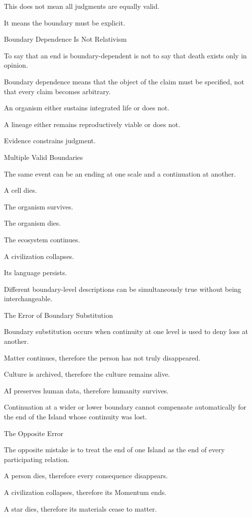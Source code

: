 This does not mean all judgments are equally valid.

It means the boundary must be explicit.

Boundary Dependence Is Not Relativism

To say that an end is boundary-dependent is not to say that death exists only in opinion.

Boundary dependence means that the object of the claim must be specified, not that every claim becomes arbitrary.

An organism either sustains integrated life or does not.

A lineage either remains reproductively viable or does not.

Evidence constrains judgment.

Multiple Valid Boundaries

The same event can be an ending at one scale and a continuation at another.

A cell dies.

The organism survives.

The organism dies.

The ecosystem continues.

A civilization collapses.

Its language persists.

Different boundary-level descriptions can be simultaneously true without being interchangeable.

The Error of Boundary Substitution

Boundary substitution occurs when continuity at one level is used to deny loss at another.

Matter continues, therefore the person has not truly disappeared.

Culture is archived, therefore the culture remains alive.

AI preserves human data, therefore humanity survives.

Continuation at a wider or lower boundary cannot compensate automatically for the end of the Island whose continuity was lost.

The Opposite Error

The opposite mistake is to treat the end of one Island as the end of every participating relation.

A person dies, therefore every consequence disappears.

A civilization collapses, therefore its Momentum ends.

A star dies, therefore its materials cease to matter.

